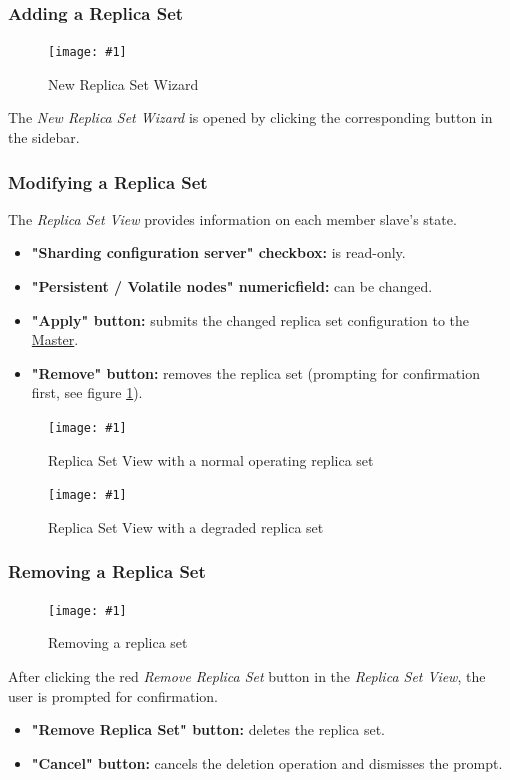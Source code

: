 \documentclass[a4paper, 11pt]{article}
\newcommand{\mamidscreenshot}[1]{\texttt{[image: \#1]}}
\newcommand{\uiel}[3]{\item \textbf{"#1" #2:} #3}
\begin{document}
\subsubsection{Adding a Replica Set}\label{subsec:ui:new_replica_set}
\begin{figure}[H]
	\centering
	\mamidscreenshot{screenshots/new_replica_set}
	\caption{New Replica Set Wizard}
\end{figure}
The \textit{New Replica Set Wizard} is opened by clicking the corresponding button in the sidebar.
\pagebreak %
\subsubsection{Modifying a Replica Set}\label{subsec:ui:modify_replica_set}
The \textit{Replica Set View} provides information on each member slave's state.
\begin{itemize}
	\uiel{Sharding configuration server}{checkbox}{is read-only.}
	\uiel{Persistent / Volatile nodes}{numericfield}{can be changed.}
	\uiel{Apply}{button}{submits the changed replica set configuration to the \hyperref[SM:Master]{Master}.}
	\uiel{Remove}{button}{removes the replica set (prompting for confirmation first, see figure \ref{fig:replica_set_remove}).}
\end{itemize}
\begin{figure}[H]
	\centering
	\mamidscreenshot{screenshots/replica_set_overview_active.png}
	\caption{Replica Set View with a normal operating replica set}
\end{figure}
\begin{figure}[H]
	\centering
	\mamidscreenshot{screenshots/replica_set_overview_degraded}
	\caption{Replica Set View with a degraded replica set}
\end{figure}
\subsubsection{Removing a Replica Set}\label{subsec:ui:remove_replica_set}
\begin{figure}[H]
	\centering
	\mamidscreenshot{screenshots/replica_set_remove}
	\caption{Removing a replica set}
	\label{fig:replica_set_remove}
\end{figure}
After clicking the red \textit{Remove Replica Set} button in the \textit{Replica Set View}, the user is prompted for confirmation.
\begin{itemize}
	\uiel{Remove Replica Set}{button} deletes the replica set.
	\uiel{Cancel}{button} cancels the deletion operation and dismisses the prompt.
\end{itemize}
\end{document}
